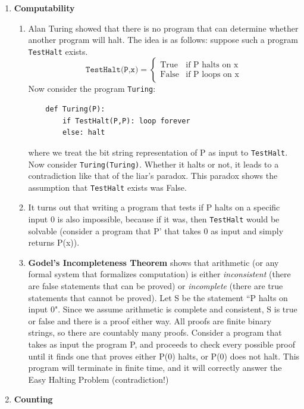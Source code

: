 \documentclass[10pt]{article}
\begin{document}
\begin{multicols}{2}
\begin{enumerate}
\begin{enumerate}
        \end{enumerate}
        \item \textbf{Computability}
        \begin{enumerate}
            \item Alan Turing showed that there is no program that can determine whether another program will halt. The idea is as follows: suppose such a program \texttt{TestHalt} exists.
            \[ \texttt{TestHalt(P,x)} =
            \begin{cases} 
                  \text{True} & \text{if P halts on x} \\
                  \text{False} & \text{if P loops on x} 
               \end{cases}
            \]
            Now consider the program \texttt{Turing}:
            \begin{verbatim}
    def Turing(P):
        if TestHalt(P,P): loop forever
        else: halt
            \end{verbatim}
            where we treat the bit string representation of P as input to \texttt{TestHalt}. Now consider \texttt{Turing(Turing)}. Whether it halts or not, it leads to a contradiction like that of the liar's paradox. This paradox shows the assumption that \texttt{TestHalt} exists was False. 
            \item It turns out that writing a program that tests if P halts on a specific input 0 is also impossible, because if it was, then \texttt{TestHalt} would be solvable (consider a program that P' that takes 0 as input and simply returns P(x)).
            \item \textbf{Godel's Incompleteness Theorem} shows that arithmetic (or any formal system that formalizes computation) is either \textit{inconsistent} (there are false statements that can be proved) or \textit{incomplete} (there are true statements that cannot be proved). Let S be the statement ``P halts on input 0". Since we assume arithmetic is complete and consistent, S is true or false and there is a proof either way. All proofs are finite binary strings, so there are countably many proofs. Consider a program that takes as input the program P, and proceeds to check every possible proof until it finds one that proves either P(0) halts, or P(0) does not halt. This program will terminate in finite time, and it will correctly answer the Easy Halting Problem (contradiction!)
        \end{enumerate}
        \newpage
        \item \textbf{Counting}

\end{enumerate}
\end{multicols}
\end{document}
